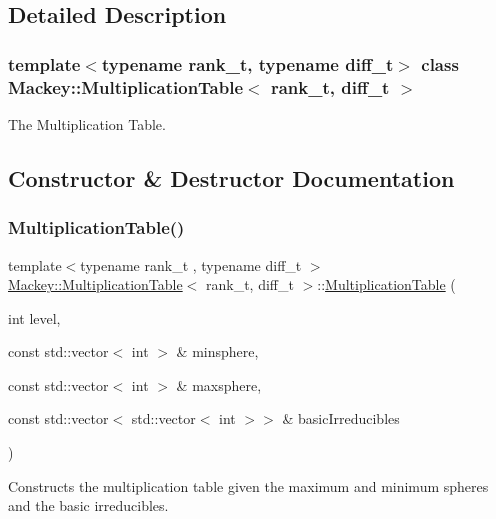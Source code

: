 \subsection{Detailed Description}
\subsubsection*{template$<$typename rank\+\_\+t, typename diff\+\_\+t$>$\newline
class Mackey\+::\+Multiplication\+Table$<$ rank\+\_\+t, diff\+\_\+t $>$}

The Multiplication Table. 

\subsection{Constructor \& Destructor Documentation}
\mbox{\label{classMackey_1_1MultiplicationTable_a8530e27d8d2c3c755eb5041a2ee8c35b}} 
\subsubsection{\texorpdfstring{Multiplication\+Table()}{MultiplicationTable()}\hspace{0.1cm}{\footnotesize\ttfamily [1/2]}}
{\footnotesize\ttfamily template$<$typename rank\+\_\+t , typename diff\+\_\+t $>$ \\
\hyperlink{classMackey_1_1MultiplicationTable}{Mackey\+::\+Multiplication\+Table}$<$ rank\+\_\+t, diff\+\_\+t $>$\+::\hyperlink{classMackey_1_1MultiplicationTable}{Multiplication\+Table} (\begin{DoxyParamCaption}\item[{int}]{level,  }\item[{const std\+::vector$<$ int $>$ \&}]{minsphere,  }\item[{const std\+::vector$<$ int $>$ \&}]{maxsphere,  }\item[{const std\+::vector$<$ std\+::vector$<$ int $>$$>$ \&}]{basic\+Irreducibles }\end{DoxyParamCaption})}



Constructs the multiplication table given the maximum and minimum spheres and the basic irreducibles. 

